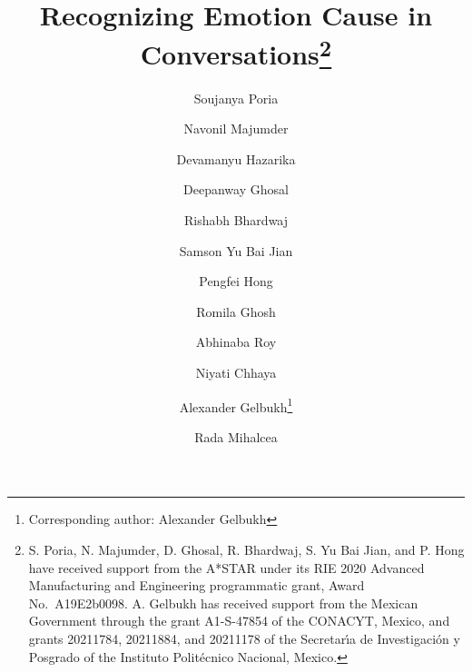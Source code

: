 \documentclass[smallextended]{svjour3}
\newcommand\0{\hphantom{0}}
\begin{document}
\title{Recognizing Emotion Cause in Conversations\thanks{S. Poria, N. Majumder, D. Ghosal, R. Bhardwaj, S. Yu Bai Jian, and P. Hong have received support from the  A*STAR under its RIE 2020 Advanced Manufacturing and Engineering programmatic grant, Award No.~A19E2b0098.
A. Gelbukh has received support from the Mexican Government through the grant A1-S-47854 of the CONACYT, Mexico, and grants 20211784, 20211884, and 20211178 of the Secretar\'{\i}a de Investigaci\'on y Posgrado of the Instituto Polit\'ecnico Nacional, Mexico.
}}


\author{Soujanya Poria
\and Navonil Majumder
\and Devamanyu Hazarika
\and Deepanway Ghosal
\and Rishabh Bhardwaj
\and Samson Yu Bai Jian
\and Pengfei Hong
\and Romila Ghosh
\and Abhinaba Roy
\and Niyati Chhaya
\and Alexander Gelbukh\thanks{Corresponding author: Alexander Gelbukh} 
\and Rada Mihalcea}












\maketitle
\end{document}
